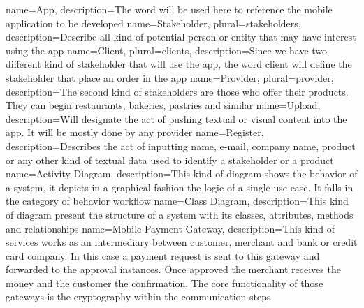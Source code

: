 
\makeglossaries


 {
    name={App},
    description={The word will be used here to reference the mobile application to be developed}
}
 {
    name={Stakeholder},
    plural={stakeholders},
    description={Describe all kind of potential person or entity that may have interest using the app}
}
 {
    name={Client},
    plural={clients},
    description={Since we have two different kind of stakeholder that will use the app, the word
                 client will define the stakeholder that place an order in the app}
}
 {
    name={Provider},
    plural={provider},
    description={The second kind of stakeholders are those who offer their products. They can begin
                restaurants, bakeries, pastries and similar}
}
 {
    name={Upload},
    description={Will designate the act of pushing textual or visual content into the app. It will
                be mostly done by any provider}
}
 {
    name={Register},
    description={Describes the act of inputting name, e-mail, company name, product or any other kind of
    textual data used to identify a stakeholder or a product}
}
 {
    name={Activity Diagram},
    description={This kind of diagram shows the behavior of a system, it depicts in a graphical fashion 
    the logic of a single use case. It falls in the category of behavior workflow \cite{refinbook:Baresi2009}}
}
 {
    name={Class Diagram},
    description={This kind of diagram present the structure of a system with its classes, attributes,
    methods and relationships\cite{refonline:IBMCD}}
}
 {
    name={Mobile Payment Gateway},
    description={This kind of services works as an intermediary between customer, merchant and bank or credit card company. 
    In this case a payment request is sent to this gateway and forwarded to the approval instances. Once approved the merchant 
    receives the money and the customer the confirmation. The core functionality of those gateways is the cryptography
    within the communication steps\cite{refonline:VPGI}}
}







